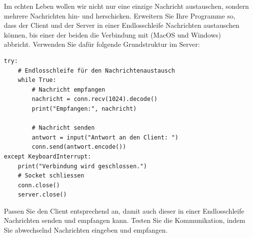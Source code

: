 \begin{myexercise}\label{ex:endlos-chat}
    Im echten Leben wollen wir nicht nur eine einzige Nachricht austauschen, sondern mehrere Nachrichten hin- und herschicken. Erweitern Sie Ihre Programme so, dass der Client und der Server in einer Endlosschleife Nachrichten austauschen können, bis einer der beiden die Verbindung mit  (MacOS und Windows) abbricht. Verwenden Sie dafür folgende Grundstruktur im Server:
    \begin{lstlisting}
try:
    # Endlosschleife für den Nachrichtenaustausch
    while True:
        # Nachricht empfangen
        nachricht = conn.recv(1024).decode()
        print("Empfangen:", nachricht)

        # Nachricht senden
        antwort = input("Antwort an den Client: ")
        conn.send(antwort.encode())
except KeyboardInterrupt:
    print("Verbindung wird geschlossen.")
    # Socket schliessen
    conn.close()
    server.close()
\end{lstlisting}

    Passen Sie den Client entsprechend an, damit auch dieser in einer Endlosschleife Nachrichten senden und empfangen kann. Testen Sie die Kommunikation, indem Sie abwechselnd Nachrichten eingeben und empfangen.
\end{myexercise}

